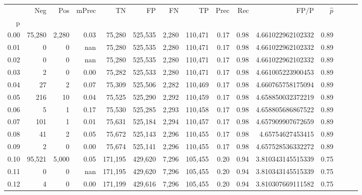 \begin{tabular}{rrrrrrrrrrrrrrr}
\toprule
{} &     Neg &     Pos & mPrec &       TN &       FP &       FN &       TP &  Prec &   Rec &                  FP/P & $\hat{p}$ \\
p    &         &         &       &          &          &          &          &       &       &                       &           \\
\midrule
0.00 &  75,280 &   2,280 &  0.03 &   75,280 &  525,535 &    2,280 &  110,471 &  0.17 &  0.98 &     4.661022962102332 &      0.89 \\
0.01 &       0 &       0 &   nan &   75,280 &  525,535 &    2,280 &  110,471 &  0.17 &  0.98 &     4.661022962102332 &      0.89 \\
0.02 &       0 &       0 &   nan &   75,280 &  525,535 &    2,280 &  110,471 &  0.17 &  0.98 &     4.661022962102332 &      0.89 \\
0.03 &       2 &       0 &  0.00 &   75,282 &  525,533 &    2,280 &  110,471 &  0.17 &  0.98 &     4.661005223900453 &      0.89 \\
0.04 &      27 &       2 &  0.07 &   75,309 &  525,506 &    2,282 &  110,469 &  0.17 &  0.98 &     4.660765758175094 &      0.89 \\
0.05 &     216 &      10 &  0.04 &   75,525 &  525,290 &    2,292 &  110,459 &  0.17 &  0.98 &     4.658850032372219 &      0.89 \\
0.06 &       5 &       1 &  0.17 &   75,530 &  525,285 &    2,293 &  110,458 &  0.17 &  0.98 &     4.658805686867522 &      0.89 \\
0.07 &     101 &       1 &  0.01 &   75,631 &  525,184 &    2,294 &  110,457 &  0.17 &  0.98 &     4.657909907672659 &      0.89 \\
0.08 &      41 &       2 &  0.05 &   75,672 &  525,143 &    2,296 &  110,455 &  0.17 &  0.98 &      4.65754627453415 &      0.89 \\
0.09 &       2 &       0 &  0.00 &   75,674 &  525,141 &    2,296 &  110,455 &  0.17 &  0.98 &     4.657528536332272 &      0.89 \\
0.10 &  95,521 &   5,000 &  0.05 &  171,195 &  429,620 &    7,296 &  105,455 &  0.20 &  0.94 &     3.810343145515339 &      0.75 \\
0.11 &       0 &       0 &   nan &  171,195 &  429,620 &    7,296 &  105,455 &  0.20 &  0.94 &     3.810343145515339 &      0.75 \\
0.12 &       4 &       0 &  0.00 &  171,199 &  429,616 &    7,296 &  105,455 &  0.20 &  0.94 &     3.810307669111582 &      0.75 \\

\end{tabular}
